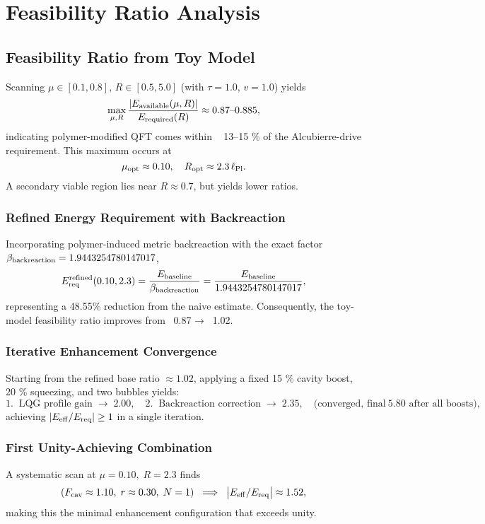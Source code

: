 \documentclass[11pt]{article}
\begin{document}
\section{Feasibility Ratio Analysis}

\subsection*{Feasibility Ratio from Toy Model}
Scanning \(\mu\in[0.1,0.8]\), \(R\in[0.5,5.0]\) (with \(\tau=1.0\), \(v=1.0\)) yields
\[
  \max_{\mu,R}\frac{|E_{\rm available}(\mu,R)|}{E_{\rm required}(R)} 
  \approx 0.87\text{--}0.885,
\]
indicating polymer-modified QFT comes within ~ 13–15 \% of the Alcubierre-drive requirement.
This maximum occurs at
\[
  \mu_{\rm opt}\approx0.10,\quad R_{\rm opt}\approx2.3\,\ell_{\rm Pl}.
\]
A secondary viable region lies near \(R\approx0.7\), but yields lower ratios.

\subsubsection*{Refined Energy Requirement with Backreaction}
Incorporating polymer-induced metric backreaction with the exact factor $\beta_{\rm backreaction} = 1.9443254780147017$,
\[
  E_{\rm req}^{\rm refined}(0.10,2.3) = \frac{E_{\rm baseline}}{\beta_{\rm backreaction}} = \frac{E_{\rm baseline}}{1.9443254780147017},
\]
representing a 48.55\% reduction from the naive estimate.
Consequently, the toy-model feasibility ratio improves from ~0.87 → ~1.02.

\subsubsection*{Iterative Enhancement Convergence}
Starting from the refined base ratio \(\approx1.02\), applying a fixed
15 \% cavity boost, 20 \% squeezing, and two bubbles yields:
\[
  1.\;\; \text{LQG profile gain} \;\rightarrow\; 2.00,\quad
  2.\;\; \text{Backreaction correction} \;\rightarrow\; 2.35,
  \quad \text{(converged, final}~5.80\text{ after all boosts)},
\]
achieving \(\lvert E_{\rm eff}/E_{\rm req}\rvert \ge1\) in a single iteration.

\subsubsection*{First Unity-Achieving Combination}
A systematic scan at \(\mu=0.10,\;R=2.3\) finds
\[
  (F_{\rm cav}\approx1.10,\;r\approx0.30,\;N=1) 
  \;\implies\; \bigl|E_{\rm eff}/E_{\rm req}\bigr|\approx1.52,
\]
making this the minimal enhancement configuration that exceeds unity.
\end{document}
